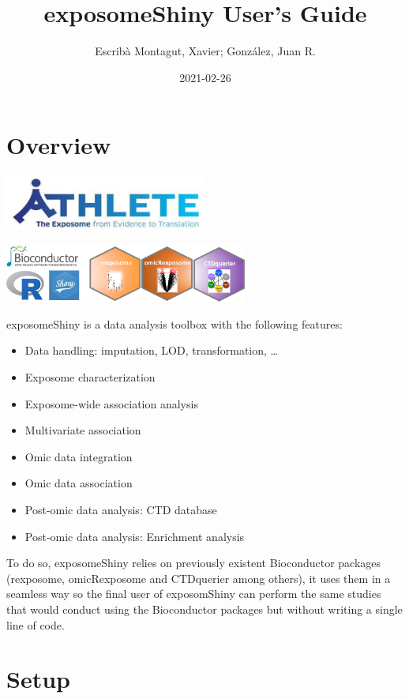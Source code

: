 \documentclass[
]{book}
\title{exposomeShiny User's Guide}
\author{Escribà Montagut, Xavier; González, Juan R.}
\date{2021-02-26}
\providecommand{\tightlist}{%
  \setlength{\itemsep}{0pt}\setlength{\parskip}{0pt}}
\begin{document}
\maketitle

{
\setcounter{tocdepth}{1}
\tableofcontents
}
\hypertarget{overview}{%
\chapter{Overview}\label{overview}}

\includegraphics[width=0.5\textwidth,height=\textheight]{images/athlete.png}

\includegraphics[width=0.6\textwidth,height=\textheight]{images/logo.png}

exposomeShiny is a data analysis toolbox with the following features:

\begin{itemize}
\tightlist
\item
  Data handling: imputation, LOD, transformation, \ldots{}
\item
  Exposome characterization
\item
  Exposome-wide association analysis
\item
  Multivariate association
\item
  Omic data integration
\item
  Omic data association
\item
  Post-omic data analysis: CTD database
\item
  Post-omic data analysis: Enrichment analysis
\end{itemize}

To do so, exposomeShiny relies on previously existent Bioconductor packages (rexposome, omicRexposome and CTDquerier among others), it uses them in a seamless way so the final user of exposomShiny can perform the same studies that would conduct using the Bioconductor packages but without writing a single line of code.

\hypertarget{setup}{%
\chapter{Setup}\label{setup}}
\end{document}
